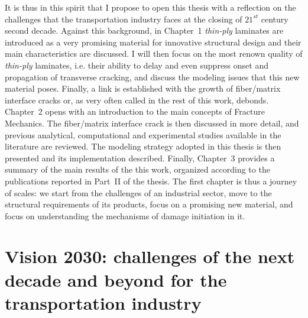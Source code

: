 It is thus in this spirit that I propose to open this thesis with a reflection on the challenges that the transportation industry faces at the closing of $21^{st}$ century second decade. Against this background, in Chapter~1 \emph{thin-ply} laminates are introduced as a very promising material for innovative structural design and their main characteristics are discussed. I will then focus on the most renown quality of \emph{thin-ply} laminates, i.e. their ability to delay and even suppress onset and propagation of transverse cracking, and discuss the modeling issues that this new material poses. Finally, a link is established with the growth of fiber/matrix interface cracks or, as very often called in the rest of this work, debonds. Chapter~2 opens with an introduction to the main concepts of Fracture Mechanics. The fiber/matrix interface crack is then discussed in more detail, and previous analytical, computational and experimental studies available in the literature are reviewed. The modeling strategy adopted in this thesis is then presented and its implementation described. Finally, Chapter~3 provides a summary of the main results of the this work, organized according to the publications reported in Part~II of the thesis. The first chapter is thus a journey of scales: we start from the challenges of an industrial sector, move to the structural requirements of its products, focus on a promising new material, and focus on understanding the mechanisms of damage initiation in it.

\section{Vision 2030: challenges of the next decade and beyond for the transportation industry}
